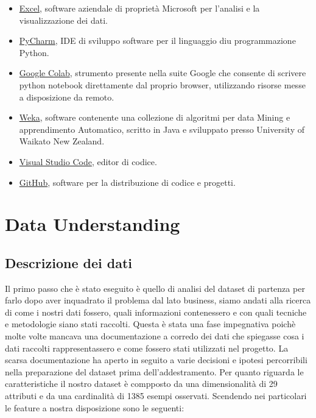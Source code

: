 \documentclass[italian,12pt,a4paper]{article}
\begin{document}
		\begin{itemize}
            \item \href{https://www.microsoft.com/it-it/microsoft-365/excel}{Excel}, software aziendale di proprietà Microsoft per l'analisi e la visualizzazione dei dati. 
            \item \href{https://www.jetbrains.com/pycharm/}{PyCharm}, IDE di sviluppo software per il linguaggio diu programmazione Python.
			\item \href{https://colab.research.google.com/}{Google Colab}, strumento  presente nella suite Google che consente di scrivere python notebook direttamente dal proprio browser, utilizzando risorse messe a disposizione da remoto. 
			\item \href{https://www.cs.waikato.ac.nz/~ml/weka/}{Weka}, software contenente una collezione di algoritmi per data Mining e apprendimento Automatico, scritto in Java e sviluppato presso University of Waikato New Zealand.
			\item \href{https://code.visualstudio.com/}{Visual Studio Code}, editor di codice.
            \item \href{https://github.com/}{GitHub}, software per la distribuzione di codice e progetti.
		\end{itemize}
    \vspace{30pt}
    
	\section{Data Understanding}
 
    \subsection{Descrizione dei dati}
    Il primo passo che è stato eseguito è quello di analisi del dataset di partenza per farlo dopo aver inquadrato il problema dal lato business, siamo andati alla ricerca di come i nostri dati fossero, quali informazioni contenessero e con quali tecniche e metodologie siano stati raccolti. Questa è stata una fase impegnativa poichè molte volte mancava una documentazione a corredo dei dati che spiegasse cosa i dati raccolti rappresentassero e come fossero stati utilizzati nel progetto. La scarsa documentazione ha aperto in seguito a varie decisioni e ipotesi percorribili nella preparazione del dataset prima dell'addestramento. Per quanto riguarda le caratteristiche il nostro dataset è compposto da una dimensionalità di 29 attributi e da una cardinalità di 1385 esempi osservati. Scendendo nei particolari le feature a nostra disposizione sono le seguenti: 
    \\ 
    
\end{document}
